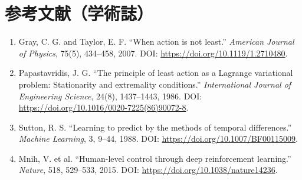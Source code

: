 \section*{参考文献（学術誌）}
\begin{enumerate}[leftmargin=2.4em]
\item Gray, C. G. and Taylor, E. F. ``When action is not least.'' \textit{American Journal of Physics}, 75(5), 434--458, 2007. DOI: \url{https://doi.org/10.1119/1.2710480}.
\item Papastavridis, J. G. ``The principle of least action as a Lagrange variational problem: Stationarity and extremality conditions.'' \textit{International Journal of Engineering Science}, 24(8), 1437--1443, 1986. DOI: \url{https://doi.org/10.1016/0020-7225(86)90072-8}.
\item Sutton, R. S. ``Learning to predict by the methods of temporal differences.'' \textit{Machine Learning}, 3, 9--44, 1988. DOI: \url{https://doi.org/10.1007/BF00115009}.
\item Mnih, V. et al. ``Human-level control through deep reinforcement learning.'' \textit{Nature}, 518, 529--533, 2015. DOI: \url{https://doi.org/10.1038/nature14236}.
\end{enumerate}

